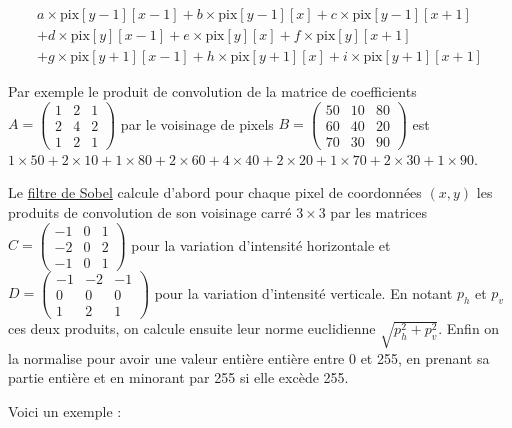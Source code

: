 \documentclass[a4paper, french, 12pt]{article}  %
\begin{document}
\begin{multline*}
a \times \text{pix}[y-1][x-1] + b \times \text{pix}[y-1][x] + c \times \text{pix}[y-1][x+1] \\
+ d \times \text{pix}[y][x-1] + e \times \text{pix}[y][x] + f \times \text{pix}[y][x+1]  \\
+ g \times \text{pix}[y+1][x-1] + h \times \text{pix}[y+1][x] + i \times \text{pix}[y+1][x+1] 
\end{multline*}


Par exemple le produit de convolution de la matrice de coefficients $A=\begin{pmatrix} 1 & 2 & 1 \\ 2 & 4 & 2 \\ 1 & 2 & 1 \end{pmatrix}$ par le voisinage de pixels $B=\begin{pmatrix} 50 & 10 & 80 \\ 60 & 40 & 20 \\ 70 & 30 & 90 \end{pmatrix}$ est $1 \times 50 + 2 \times 10 + 1 \times 80 + 2 \times 60 + 4 \times 40 + 2 \times 20 + 1 \times 70 + 2 \times 30 + 1 \times 90$.


Le \href{https://fr.wikipedia.org/wiki/Filtre_de_Sobel}{filtre de Sobel} calcule d'abord pour chaque pixel de coordonnées $(x,y)$ les produits de convolution de son voisinage carré $3 \times 3$ par les matrices $C=\begin{pmatrix} -1 & 0 & 1 \\ -2 & 0 & 2 \\ -1 & 0 & 1 \end{pmatrix}$ pour la variation d'intensité horizontale et  $D=\begin{pmatrix}  -1 & -2 & -1 \\ 0 & 0 & 0 \\ 1 & 2 & 1 \end{pmatrix}$ pour la variation d'intensité verticale. En notant $p_{h}$ et $p_{v}$ ces deux produits,  on calcule ensuite leur norme euclidienne $\sqrt{p_{h}^{2}+p_{v}^{2}}$. Enfin  on la normalise pour avoir une valeur entière entière entre 0 et 255, en prenant sa partie  entière et  en minorant par 255 si elle excède 255.

Voici un exemple :
\end{document}
